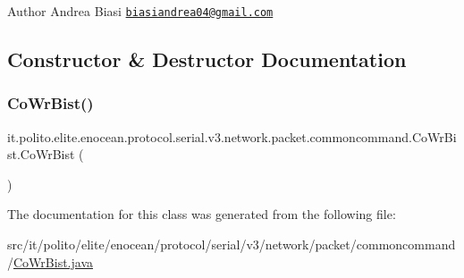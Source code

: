 \begin{DoxyAuthor}{Author}
Andrea Biasi \href{mailto:biasiandrea04@gmail.com}{\tt biasiandrea04@gmail.\+com} 
\end{DoxyAuthor}


\subsection{Constructor \& Destructor Documentation}
\hypertarget{classit_1_1polito_1_1elite_1_1enocean_1_1protocol_1_1serial_1_1v3_1_1network_1_1packet_1_1commoncommand_1_1_co_wr_bist_a9170729c969f69d09bc7c89d777035be}{}\label{classit_1_1polito_1_1elite_1_1enocean_1_1protocol_1_1serial_1_1v3_1_1network_1_1packet_1_1commoncommand_1_1_co_wr_bist_a9170729c969f69d09bc7c89d777035be} 
\subsubsection{\texorpdfstring{Co\+Wr\+Bist()}{CoWrBist()}}
{\footnotesize\ttfamily it.\+polito.\+elite.\+enocean.\+protocol.\+serial.\+v3.\+network.\+packet.\+commoncommand.\+Co\+Wr\+Bist.\+Co\+Wr\+Bist (\begin{DoxyParamCaption}{ }\end{DoxyParamCaption})}



The documentation for this class was generated from the following file\+:\begin{DoxyCompactItemize}
\item 
src/it/polito/elite/enocean/protocol/serial/v3/network/packet/commoncommand/\hyperlink{_co_wr_bist_8java}{Co\+Wr\+Bist.\+java}\end{DoxyCompactItemize}
